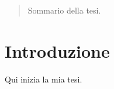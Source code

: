 \documentclass[a4paper,10pt]{memoir}
\begin{document}
\frontmatter

\maketitle
\cleardoublepage

\begin{abstract}
	\thispagestyle{plain}
	Sommario della tesi.
\end{abstract}
\cleardoublepage

\tableofcontents
\cleardoublepage

\mainmatter

\chapter{Introduzione}

Qui inizia la mia tesi.
\end{document}
